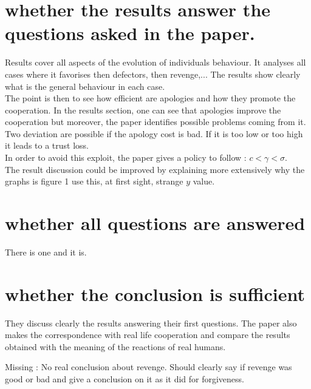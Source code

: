 \documentclass{article}
\begin{document}
\section{whether the results answer the questions asked in the paper.}
Results cover all aspects of the evolution of individuals behaviour. It analyses all cases where it favorises then defectors, then revenge,... 
The results show clearly what is the general behaviour in each case.\\


The point is then to see how efficient are apologies and how they promote the cooperation. In the results section, one can see that apologies improve the cooperation but moreover, the paper identifies possible problems coming from it. \\
Two deviation are possible if the apology cost is bad. If it is too low or too high it leads to a trust loss.\\
In order to avoid this exploit, the paper gives a policy to follow : $c<\gamma<\sigma$.\\

The result discussion could be improved by explaining more extensively why the graphs is figure 1 use this, at first sight, strange $y$ value.

\section{whether all questions are answered}
There is one and  it is.


\section{whether the conclusion is sufficient}

They discuss clearly the results answering their first questions. 
The paper also makes the correspondence with real life cooperation and compare the results obtained with the meaning of the reactions of real humans.

Missing : No real conclusion about revenge. Should clearly say if revenge was good or bad and give a conclusion on it as it did for forgiveness.
\end{document}
